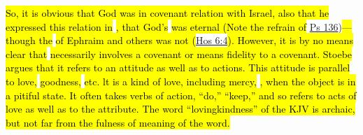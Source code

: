 \begin{compactdesc}
\begin{compactdesc}
							\item[307] \hl{So, it is obvious that God was in covenant relation with Israel, also that he expressed this relation in} \he{.hEsEd}\hl{, that God's}  \hl{was eternal (Note the refrain of} \hyperref[PSALMS-136]{Ps 136})\hl{---though the } \hl{of Ephraim and others was not (}\hyperref[HOSEA-6-4]{Hos 6:4}\hl{). However, it is by no means clear that}  \hl{necessarily involves a covenant or means fidelity to a covenant. Stoebe argues that it refers to an attitude as well as to actions. This attitude is parallel to love, } \hl{goodness,}  \hl{etc. lt is a kind of love, including mercy, }\hl{, when the object is in a pitiful state. It often takes verbs of action, ``do,'' ``keep,'' and so refers to acts of love as well as to the attribute. The word ``lovingkindness'' of the KJV is archaic, but not far from the fulness of meaning of the word.}
						\end{compactdesc}
				\end{compactdesc}
				
			
		
		
	
			
	
			
